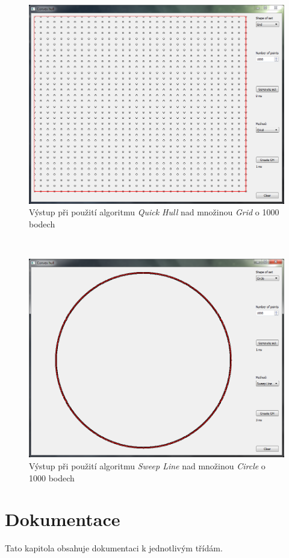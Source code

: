 \documentclass[a4paper, 12pt]{article}
\begin{document}
\begin{figure}[h!]
	\centering
	\includegraphics[width=13cm]{./pictures/app_raster_qhull.png}
	\caption{Výstup při použití algoritmu \textit{Quick Hull} nad množinou \textit{Grid} o 1000 bodech}
\end{figure}
~

\begin{figure}[h!]
	\centering
	\includegraphics[width=13cm]{./pictures/app_circle_sweep.png}
	\caption{Výstup při použití algoritmu \textit{Sweep Line} nad množinou \textit{Circle} o 1000 bodech}
\end{figure}

\clearpage
 
\section{Dokumentace}
Tato kapitola obsahuje dokumentaci k jednotlivým třídám.
\end{document}
